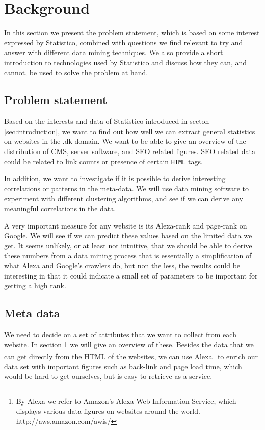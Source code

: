 \section{Background}
\label{sec:background}
In this section we present the problem statement, which is based on some interest expressed by Statistico, combined with questions we find relevant to try and answer with different data mining techniques. We also provide a short introduction to technologies used by Statistico and discuss how they can, and cannot, be used to solve the problem at hand.

\subsection{Problem statement}
\label{subsec:problem_statement}
Based on the interests and data of Statistico introduced in secton \ref{sec:introduction}, we want to find out how well we can extract general statistics on websites in the .dk domain. We want to be able to give an overview of the distribution of CMS, server software, and SEO related figures. SEO related data could be related to link counts or presence of certain \texttt{HTML} tags.

In addition, we want to investigate if it is possible to derive interesting correlations or patterns in the meta-data. We will use data mining software to experiment with different clustering algorithms, and see if we can derive any meaningful correlations in the data.

A very important measure for any website is its Alexa-rank and page-rank on Google. We will see if we can predict these values based on the limited data we get. It seems unlikely, or at least not intuitive, that we should be able to derive these numbers from a data mining process that is essentially a simplification of what Alexa and Google's crawlers do, but non the less, the results could be interesting in that it could indicate a small set of parameters to be important for getting a high rank.

\subsection{Meta data}
\label{subsec:meta_data}
We need to decide on a set of attributes that we want to collect from each website. In section \ref{sec:background} we will give an overview of these. Besides the data that we can get directly from the HTML of the websites, we can use Alexa\footnote{By Alexa we refer to Amazon's Alexa Web Information Service, which displays various data figures on websites around the world. http://aws.amazon.com/awis/} to enrich our data set with important figures such as back-link and page load time, which would be hard to get ourselves, but is easy to retrieve as a service.

